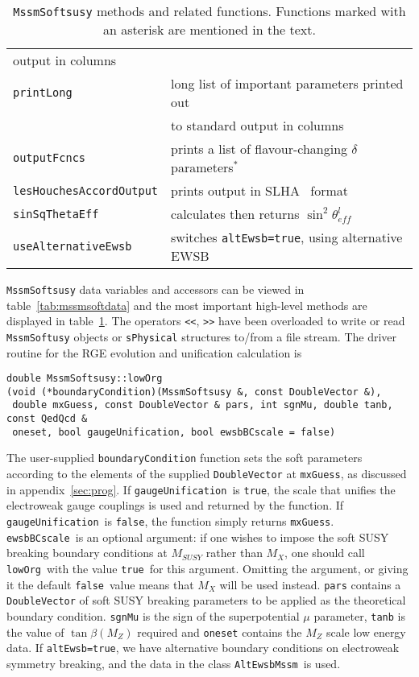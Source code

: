 \documentclass[]{article}
\def\code#1{\small{\tt #1}\normalsize}
\begin{document}
\begin{table}
\begin{center}
\begin{tabular}{ll}
output in columns\\ 
\code{printLong} & long list of important parameters printed out \\ &to standard
output in columns\\ 
\code{outputFcncs} & prints a list of flavour-changing $\delta$
parameters$^*$\\
\code{lesHouchesAccordOutput} & prints output in SLHA~\cite{lhacc} format\\
\code{sinSqThetaEff} & calculates then returns $\sin^2\theta_{eff}^l$\\
\code{useAlternativeEwsb} & switches \code{altEwsb=true}, using alternative
EWSB \\ 
\end{tabular}
\caption{\label{tab:softmeth}\code{MssmSoftsusy} methods and related functions. Functions marked with an
asterisk are mentioned in the text.}\end{center}\end{table}

\code{MssmSoftsusy} data variables and accessors can be viewed in
table~\ref{tab:mssmsoftdata} and the most important high-level 
methods are displayed in table~\ref{tab:softmeth}.
The operators \code{<<}, \code{>>} have been overloaded to write or read 
\code{MssmSoftusy} objects or \code{sPhysical} structures to/from a file
stream. 
The driver routine for the RGE evolution and unification calculation is
\small
\begin{verbatim}
double MssmSoftsusy::lowOrg
(void (*boundaryCondition)(MssmSoftsusy &, const DoubleVector &),
 double mxGuess, const DoubleVector & pars, int sgnMu, double tanb, const QedQcd &
 oneset, bool gaugeUnification, bool ewsbBCscale = false)
\end{verbatim}
\normalsize
The user-supplied \code{boundaryCondition} function sets the soft parameters 
according to 
the elements of the supplied \code{DoubleVector} at \code{mxGuess}, 
as discussed in appendix~\ref{sec:prog}. If \code{gaugeUnification}~is
\code{true}, the scale that unifies the electroweak gauge couplings is used
and returned by the function. If \code{gaugeUnification}~is \code{false}, the
function simply returns \code{mxGuess}.
\code{ewsbBCscale}~is an optional argument: if one wishes to impose the soft
SUSY breaking boundary conditions at $M_{SUSY}$ rather than $M_X$, one should
call \code{lowOrg}~with the value \code{true}~for this argument. Omitting the
argument, or giving it the default \code{false}~value means that $M_X$ will be
used instead. 
\code{pars} contains a \code{DoubleVector}
of soft SUSY breaking parameters to be applied as the theoretical boundary
condition.  
\code{sgnMu} is the sign of the
superpotential $\mu$ parameter, \code{tanb} is the value of $\tan \beta (M_Z)$
required and \code{oneset} contains the $M_Z$ scale low energy data.
If \code{altEwsb=true}, we have alternative boundary conditions on electroweak
symmetry breaking, and the data in the class \code{AltEwsbMssm}~is used.
\end{document}
